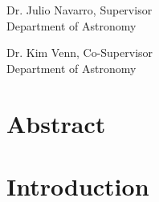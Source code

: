 \documentclass[12pt,oneside,letterpaper]{report}
\newcommand{\skipline}{\vspace{\baselineskip}}
\begin{document}
Dr. Julio Navarro, Supervisor\\
Department of Astronomy \\
\skipline

\noindent Dr. Kim Venn, Co-Supervisor\\
Department of Astronomy


\chapter*{Abstract}


% 


\tableofcontents
\listoffigures
\listoftables

%
%
%
%
%
%
%
%
\newpage






\chapter{Introduction}






\newpage

 
\end{document}
